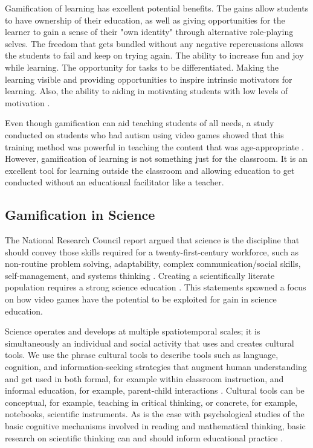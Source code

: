 	Gamification of learning has excellent potential benefits. The gains allow students to have ownership of their education, as well as giving opportunities for the learner to gain a sense of their "own identity" through alternative role-playing selves. The freedom that gets bundled without any negative repercussions allows the students to fail and keep on trying again. The ability to increase fun and joy while learning. The opportunity for tasks to be differentiated. Making the learning visible and providing opportunities to inspire intrinsic motivators for learning. Also, the ability to aiding in motivating students with low levels of motivation \cite{22}. 
	
	Even though gamification can aid teaching students of all needs, a study conducted on students who had autism using video games showed that this training method was powerful in teaching the content that was age-appropriate \cite{26}. However, gamification of learning is not something just for the classroom. It is an excellent tool for learning outside the classroom and allowing education to get conducted without an educational facilitator like a teacher. 
	
	\subsection{Gamification in Science}
	\label{sec:game_in_science}
	
	The National Research Council report argued that science is the discipline that should convey those skills required for a twenty-first-century workforce, such as non-routine problem solving, adaptability, complex communication/social skills, self-management, and systems thinking \cite{national2010exploring}. Creating a scientifically literate population requires a strong science education \cite{morris2013gaming}. This statements spawned a focus on how video games have the potential to be exploited for gain in science education.
	
	Science operates and develops at multiple spatiotemporal scales; it is simultaneously an individual and social activity that uses and creates cultural tools. We use the phrase cultural tools \cite{weiner1995attribution} to describe tools such as language, cognition, and information-seeking strategies that augment human understanding and get used in both formal, for example within classroom instruction, and informal education, for example, parent-child interactions \cite{rosas2003beyond}. Cultural tools can be conceptual, for example, teaching in critical thinking, or concrete, for example, notebooks, scientific instruments. As is the case with psychological studies of the basic cognitive mechanisms involved in reading and mathematical thinking, basic research on scientific thinking can and should inform educational practice \cite{morris2013gaming}.
	
